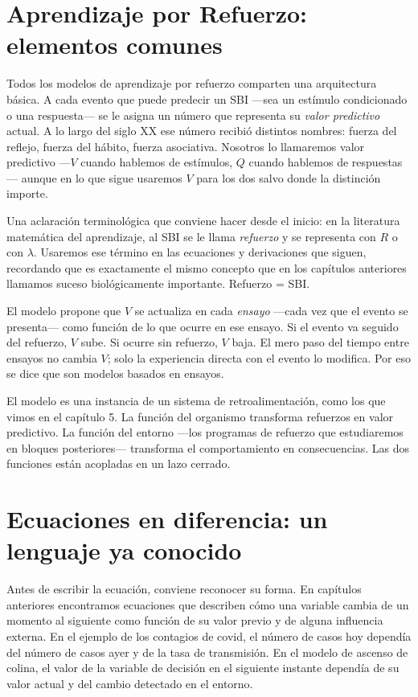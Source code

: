 \documentclass[
  letterpaper,
  DIV=11,
  numbers=noendperiod]{scrreprt}
\begin{document}
\begin{tcolorbox}[enhanced jigsaw, toprule=.15mm, arc=.35mm, colback=white, opacityback=0, colframe=quarto-callout-note-color-frame, breakable, rightrule=.15mm, left=2mm, leftrule=.75mm, bottomrule=.15mm]
\section{Aprendizaje por Refuerzo: elementos
comunes}\label{aprendizaje-por-refuerzo-elementos-comunes}

Todos los modelos de aprendizaje por refuerzo comparten una arquitectura
básica. A cada evento que puede predecir un SBI ---sea un estímulo
condicionado o una respuesta--- se le asigna un número que representa su
\emph{valor predictivo} actual. A lo largo del siglo XX ese número
recibió distintos nombres: fuerza del reflejo, fuerza del hábito, fuerza
asociativa. Nosotros lo llamaremos valor predictivo ---\(V\) cuando
hablemos de estímulos, \(Q\) cuando hablemos de respuestas--- aunque en
lo que sigue usaremos \(V\) para los dos salvo donde la distinción
importe.

Una aclaración terminológica que conviene hacer desde el inicio: en la
literatura matemática del aprendizaje, al SBI se le llama
\emph{refuerzo} y se representa con \(R\) o con \(\lambda\). Usaremos
ese término en las ecuaciones y derivaciones que siguen, recordando que
es exactamente el mismo concepto que en los capítulos anteriores
llamamos suceso biológicamente importante. Refuerzo = SBI.

El modelo propone que \(V\) se actualiza en cada \emph{ensayo} ---cada
vez que el evento se presenta--- como función de lo que ocurre en ese
ensayo. Si el evento va seguido del refuerzo, \(V\) sube. Si ocurre sin
refuerzo, \(V\) baja. El mero paso del tiempo entre ensayos no cambia
\(V\); solo la experiencia directa con el evento lo modifica. Por eso se
dice que son modelos basados en ensayos.

El modelo es una instancia de un sistema de retroalimentación, como los
que vimos en el capítulo 5. La función del organismo transforma
refuerzos en valor predictivo. La función del entorno ---los programas
de refuerzo que estudiaremos en bloques posteriores--- transforma el
comportamiento en consecuencias. Las dos funciones están acopladas en un
lazo cerrado.

\section{Ecuaciones en diferencia: un lenguaje ya
conocido}\label{ecuaciones-en-diferencia-un-lenguaje-ya-conocido}

Antes de escribir la ecuación, conviene reconocer su forma. En capítulos
anteriores encontramos ecuaciones que describen cómo una variable cambia
de un momento al siguiente como función de su valor previo y de alguna
influencia externa. En el ejemplo de los contagios de covid, el número
de casos hoy dependía del número de casos ayer y de la tasa de
transmisión. En el modelo de ascenso de colina, el valor de la variable
de decisión en el siguiente instante dependía de su valor actual y del
cambio detectado en el entorno.


\end{tcolorbox}
\end{document}
